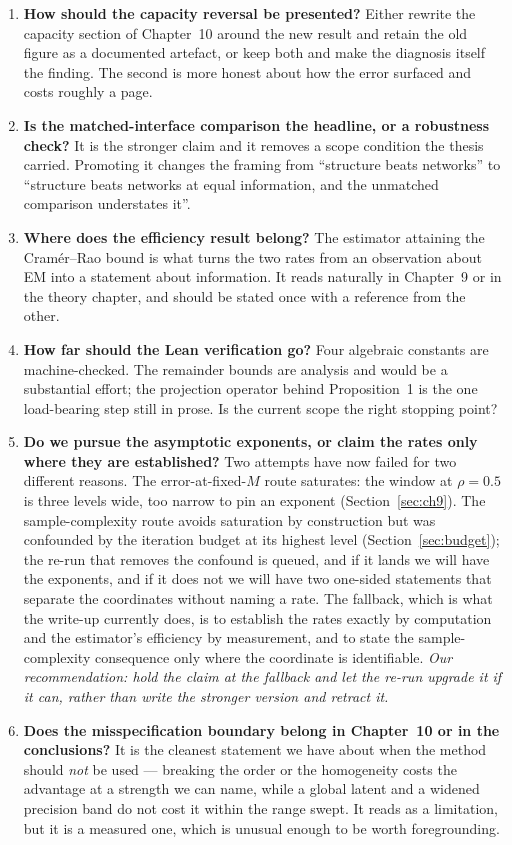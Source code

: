 \documentclass[11pt,a4paper]{article}
\newcommand{\hi}[1]{\textbf{#1}}
\begin{document}
\begin{enumerate}
\item \hi{How should the capacity reversal be presented?} Either rewrite the capacity section of
Chapter~10 around the new result and retain the old figure as a documented artefact, or keep both
and make the diagnosis itself the finding. The second is more honest about how the error surfaced
and costs roughly a page.

\item \hi{Is the matched-interface comparison the headline, or a robustness check?} It is the
stronger claim and it removes a scope condition the thesis carried. Promoting it changes the
framing from ``structure beats networks'' to ``structure beats networks at equal information, and
the unmatched comparison understates it''.

\item \hi{Where does the efficiency result belong?} The estimator attaining the Cram\'er--Rao bound
is what turns the two rates from an observation about EM into a statement about information. It
reads naturally in Chapter~9 or in the theory chapter, and should be stated once with a reference
from the other.

\item \hi{How far should the Lean verification go?} Four algebraic constants are machine-checked.
The remainder bounds are analysis and would be a substantial effort; the projection operator behind
Proposition~1 is the one load-bearing step still in prose. Is the current scope the right stopping
point?

\item \hi{Do we pursue the asymptotic exponents, or claim the rates only where they are
established?} Two attempts have now failed for two different reasons. The error-at-fixed-$M$ route
saturates: the window at $\rho=0.5$ is three levels wide, too narrow to pin an exponent
(Section~\ref{sec:ch9}). The sample-complexity route avoids saturation by construction but was
confounded by the iteration budget at its highest level (Section~\ref{sec:budget}); the re-run
that removes the confound is queued, and if it lands we will have the exponents, and if it does
not we will have two one-sided statements that separate the coordinates without naming a rate. The
fallback, which is what the write-up currently does, is to establish the rates exactly by
computation and the estimator's efficiency by measurement, and to state the sample-complexity
consequence only where the coordinate is identifiable. \emph{Our recommendation: hold the claim at
the fallback and let the re-run upgrade it if it can, rather than write the stronger version and
retract it.}
\item \hi{Does the misspecification boundary belong in Chapter~10 or in the conclusions?} It is
the cleanest statement we have about when the method should \emph{not} be used --- breaking the
order or the homogeneity costs the advantage at a strength we can name, while a global latent and
a widened precision band do not cost it within the range swept. It reads as a limitation, but it
is a measured one, which is unusual enough to be worth foregrounding.


\end{enumerate}
\end{document}
